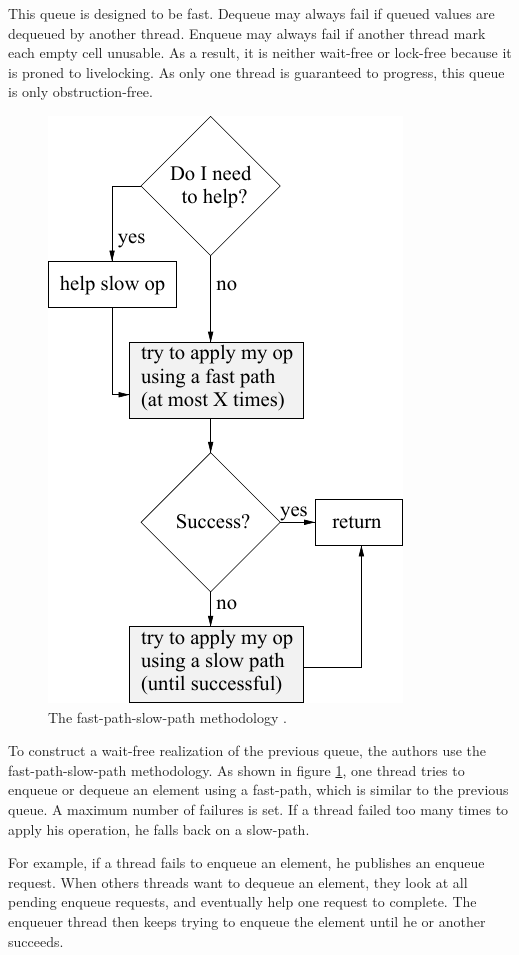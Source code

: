 This queue is designed to be fast. Dequeue may always fail if queued values are
dequeued by another thread. Enqueue may always fail if another thread mark each
empty cell unusable. As a result, it is neither wait-free or lock-free because
it is proned to livelocking. As only one thread is guaranteed to progress, this
queue is only obstruction-free. \\

\begin{figure}
    \caption{The fast-path-slow-path methodology \cite{Kogan:2012:MCF:2370036.2145835}.}
    \label{fig:fpsp}
    \center
    \includegraphics[width=0.6\linewidth]{img/fpsp.pdf}
\end{figure}

 To construct a wait-free realization of the previous
queue, the authors use the fast-path-slow-path methodology. As shown in figure
\ref{fig:fpsp}, one thread tries to enqueue or dequeue an element using a
fast-path, which is similar to the previous queue. A maximum number of failures
is set. If a thread failed too many times to apply his operation, he falls back
on a slow-path.

For example, if a thread fails to enqueue an element, he publishes an enqueue
request. When others threads want to dequeue an element, they look at all
pending enqueue requests, and eventually help one request to complete. The
enqueuer thread then keeps trying to enqueue the element until he or another
succeeds.

